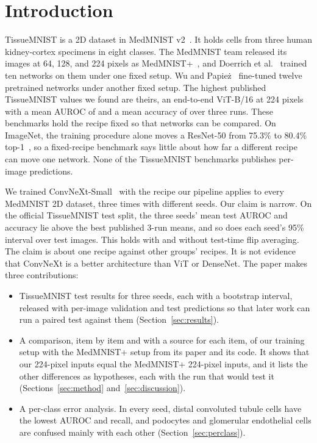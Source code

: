 \documentclass[conference]{IEEEtran}
\newif\ifanycitation
\let\citeAnyKey\cite
\renewcommand{\cite}{\global\anycitationtrue\citeAnyKey}
\begin{document}
\section{Introduction}

TissueMNIST is a 2D dataset in MedMNIST v2~\cite{yang2023medmnistv2}. It holds cells from
three human kidney-cortex specimens in eight classes. The MedMNIST team released its
images at 64, 128, and 224 pixels as MedMNIST+~\cite{yang2024medmnistplusnotes}, and
Doerrich et al.~\cite{doerrich2025medmnistplus} trained ten networks on them under one
fixed setup. Wu and Papie\.{z}~\cite{wu2025rethinking} fine-tuned twelve pretrained
networks under another fixed setup. The highest published TissueMNIST values we found are
theirs, an end-to-end ViT-B/16 at 224 pixels with a mean AUROC of \baseBestAuroc{} and a
mean accuracy of \baseBestAcc{} over three runs. These benchmarks hold the recipe fixed so
that networks can be compared. On ImageNet, the training procedure alone moves a ResNet-50
from 75.3\% to 80.4\% top-1~\cite{wightman2021resnet}, so a fixed-recipe benchmark says
little about how far a different recipe can move one network. None of the TissueMNIST
benchmarks publishes per-image predictions.

We trained ConvNeXt-Small~\cite{liu2022convnext} with the recipe our pipeline applies to
every MedMNIST 2D dataset, three times with different seeds. Our claim is narrow. On the
official TissueMNIST test split, the three seeds' mean test AUROC and accuracy lie above
the best published 3-run means, and so does each seed's 95\% interval over test images.
This holds with and without test-time flip averaging. The claim is about one recipe against other groups' recipes. It is not evidence that
ConvNeXt is a better architecture than ViT or DenseNet. The paper makes three
contributions:
\begin{itemize}
\item TissueMNIST test results for three seeds, each with a bootstrap interval, released
with per-image validation and test predictions so that later work can run a paired test
against them (Section~\ref{sec:results}).
\item A comparison, item by item and with a source for each item, of our training setup
with the MedMNIST+ setup from its paper and its code. It shows that our 224-pixel inputs
equal the MedMNIST+ 224-pixel inputs, and it lists the other differences as hypotheses,
each with the run that would test it (Sections~\ref{sec:method} and~\ref{sec:discussion}).
\item A per-class error analysis. In every seed, distal convoluted tubule cells have the
lowest AUROC and recall, and podocytes and glomerular endothelial cells are confused
mainly with each other (Section~\ref{sec:perclass}).
\end{itemize}
\end{document}
